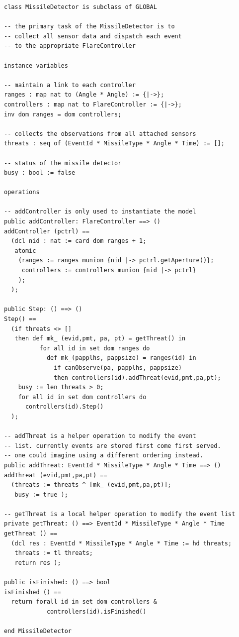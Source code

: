 \documentclass{overturerepchap}
\begin{document}
\begin{lstlisting}
class MissileDetector is subclass of GLOBAL

-- the primary task of the MissileDetector is to
-- collect all sensor data and dispatch each event
-- to the appropriate FlareController

instance variables

-- maintain a link to each controller
ranges : map nat to (Angle * Angle) := {|->};
controllers : map nat to FlareController := {|->};
inv dom ranges = dom controllers;

-- collects the observations from all attached sensors
threats : seq of (EventId * MissileType * Angle * Time) := [];

-- status of the missile detector
busy : bool := false

operations

-- addController is only used to instantiate the model
public addController: FlareController ==> ()
addController (pctrl) ==
  (dcl nid : nat := card dom ranges + 1;
   atomic
    (ranges := ranges munion {nid |-> pctrl.getAperture()};
     controllers := controllers munion {nid |-> pctrl}
    );
  );

public Step: () ==> ()
Step() ==
  (if threats <> []
   then def mk_ (evid,pmt, pa, pt) = getThreat() in
          for all id in set dom ranges do
            def mk_(papplhs, pappsize) = ranges(id) in
              if canObserve(pa, papplhs, pappsize)
              then controllers(id).addThreat(evid,pmt,pa,pt);
    busy := len threats > 0;
    for all id in set dom controllers do
      controllers(id).Step()
  );
 
-- addThreat is a helper operation to modify the event
-- list. currently events are stored first come first served.
-- one could imagine using a different ordering instead.
public addThreat: EventId * MissileType * Angle * Time ==> ()
addThreat (evid,pmt,pa,pt) == 
  (threats := threats ^ [mk_ (evid,pmt,pa,pt)];
   busy := true );

-- getThreat is a local helper operation to modify the event list
private getThreat: () ==> EventId * MissileType * Angle * Time
getThreat () ==
  (dcl res : EventId * MissileType * Angle * Time := hd threats;
   threats := tl threats;
   return res );

public isFinished: () ==> bool
isFinished () ==
  return forall id in set dom controllers &
            controllers(id).isFinished()

end MissileDetector
\end{lstlisting}
\end{document}
